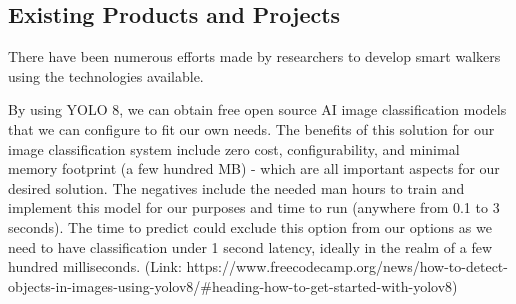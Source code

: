 \subsection{Existing Products and Projects}
\noindent There have been numerous efforts made by researchers to develop smart walkers using the technologies available.
\newline

\newline
\noident By using YOLO 8, we can obtain free open source AI image classification models that we can configure to fit our own needs. The benefits of this solution for our image classification system include zero cost, configurability, and minimal memory footprint (a few hundred MB) - which are all important aspects for our desired solution. The negatives include the needed man hours to train and implement this model for our purposes and time to run (anywhere from 0.1 to 3 seconds). The time to predict could exclude this option from our options as we need to have classification under 1 second latency, ideally in the realm of a few hundred milliseconds.
(Link: https://www.freecodecamp.org/news/how-to-detect-objects-in-images-using-yolov8/#heading-how-to-get-started-with-yolov8) 
\newline 

\newline
